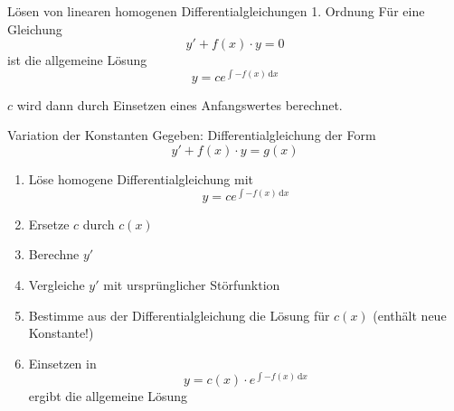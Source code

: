 \documentclass[german]{../spicker}
\renewcommand{\d}{\,\mathrm{d}}
\begin{document}
\begin{algo}{Lösen von linearen homogenen Differentialgleichungen 1. Ordnung}
    Für eine Gleichung
    $$
        \boxed{y' + f(x)\cdot y = 0}
    $$
    ist die allgemeine Lösung
    $$
        y = ce^{\int -f(x) \d x}
    $$

    $c$ wird dann durch Einsetzen eines Anfangswertes berechnet.
\end{algo}

\begin{algo}{Variation der Konstanten}
    Gegeben: Differentialgleichung der Form
    $$
        \boxed{y' + f(x)\cdot y = g(x)}
    $$
    \begin{enumerate}
        \item Löse homogene Differentialgleichung mit
              $$
                  y = ce^{\int - f(x) \d x}
              $$
        \item Ersetze $c$ durch $c(x)$
        \item Berechne $y'$
        \item Vergleiche $y'$ mit ursprünglicher Störfunktion
        \item Bestimme aus der Differentialgleichung die Lösung für $c(x)$ (enthält neue Konstante!)
        \item Einsetzen in
              $$
                  y = c(x) \cdot e^{\int - f(x) \d x}
              $$
              ergibt die allgemeine Lösung
    \end{enumerate}
\end{algo}
\end{document}

